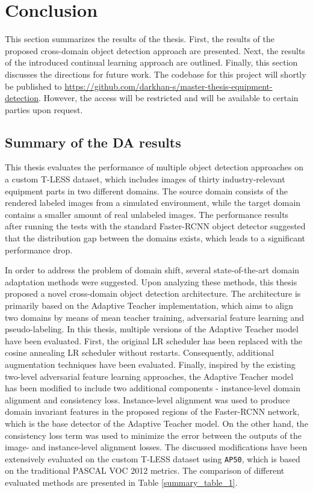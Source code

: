 
\section{Conclusion} 
This section summarizes the results of the thesis. First, the results of the proposed cross-domain object detection approach are presented. Next, the results of the introduced continual learning approach are outlined. Finally, this section discusses the directions for future work. The codebase for this project will shortly be published to \url{https://github.com/darkhan-s/master-thesis-equipment-detection}. However, the access will be restricted and will be available to certain parties upon request.  

\subsection{Summary of the DA results}

This thesis evaluates the performance of multiple object detection approaches on a custom T-LESS dataset, which includes images of thirty industry-relevant equipment parts in two different domains. The source domain consists of the rendered labeled images from a simulated environment, while the target domain contains a smaller amount of real unlabeled images. The performance results after running the tests with the standard Faster-RCNN object detector suggested that the distribution gap between the domains exists, which leads to a significant performance drop. 

In order to address the problem of domain shift, several state-of-the-art domain adaptation methods were suggested. Upon analyzing these methods, this thesis proposed a novel cross-domain object detection architecture. The architecture is primarily based on the Adaptive Teacher implementation, which aims to align two domains by means of mean teacher training, adversarial feature learning and pseudo-labeling. In this thesis, multiple versions of the Adaptive Teacher model have been evaluated. First, the original LR scheduler has been replaced with the cosine annealing LR scheduler without restarts. Consequently, additional augmentation techniques have been evaluated. Finally, inspired by the existing two-level adversarial feature learning approaches, the Adaptive Teacher model has been modified to include two additional components - instance-level domain alignment and consistency loss. Instance-level alignment was used to produce domain invariant features in the proposed regions of the Faster-RCNN network, which is the base detector of the Adaptive Teacher model. On the other hand, the consistency loss term was used to minimize the error between the outputs of the image- and instance-level alignment losses. The discussed modifications have been extensively evaluated on the custom T-LESS dataset using \texttt{AP50}, which is based on the traditional PASCAL VOC 2012 metrics. The comparison of different evaluated methods are presented in Table \ref{summary_table_1}. 

